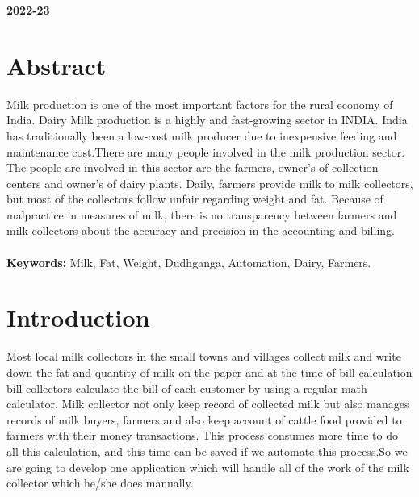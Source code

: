 \documentclass[english]{article}
\begin{document}
\begin{center}
\textbf{\Large 2022-23}
\end{center}

\clearpage %





\vspace{20pt}
\section*{Abstract}%
%

Milk production is one of the most important factors for the rural economy of India.
Dairy Milk production is a highly and fast-growing sector in INDIA. India has traditionally been a low-cost milk producer due to inexpensive feeding and maintenance cost.There are many people involved in the milk production sector. The people are involved in this sector are the farmers, owner’s of collection centers and owner’s of dairy plants. 
Daily, farmers provide milk to milk collectors, but most of the collectors follow unfair regarding weight and fat. Because of malpractice in measures of milk, there is no transparency between farmers and milk collectors about the accuracy and precision in the accounting and billing.
\\\\
\textbf{Keywords:} Milk, Fat, Weight, Dudhganga, Automation, Dairy, Farmers.



\clearpage %

\tableofcontents


\clearpage

\section{Introduction} %
Most local milk collectors in the small towns and villages collect milk and write down the fat and quantity of milk on the paper and at the time of bill calculation bill collectors calculate the bill of each customer by using a regular math calculator. Milk collector not only keep record of collected milk but also manages records of milk buyers, farmers and also keep account of cattle food provided to farmers with their money transactions. This process consumes more time to do all this calculation, and this time can be saved if we automate this process.So we are going to develop one application which will handle all of the work of the milk collector which he/she does manually.\\
\end{document}
